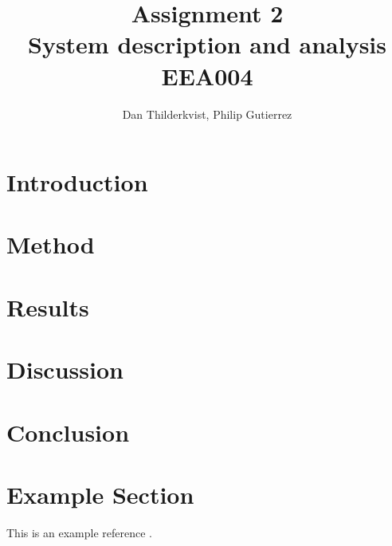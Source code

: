 \documentclass[a4paper, titlepage]{article}
\title{Assignment 2\\
System description and analysis\\
\large EEA004}
\author{Dan Thilderkvist, Philip Gutierrez}
\begin{document}
\maketitle

\section{Introduction}

\section{Method}

\section{Results}

\section{Discussion}

\section{Conclusion}

\clearpage


\clearpage
\appendix

\section{Example Section}
This is an example reference \citep{glad00}.



\end{document}
